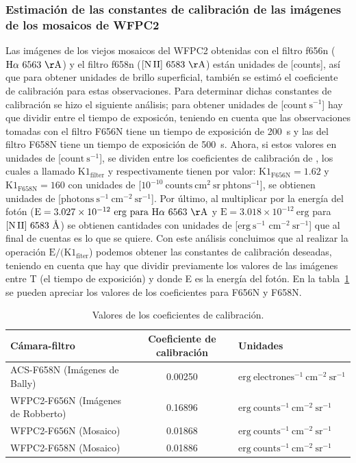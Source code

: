\subsubsection{Estimación de las  constantes de calibración de las imágenes de los mosaicos de WFPC2}
\label{sec:wpfc2}
Las imágenes de los viejos mosaicos del WFPC2  obtenidas con el filtro f656n (\(\mathrm{\ha~6563~\AA{}}\)) y el filtro f658n (\(\mathrm{\nii~6583~\AA{}}\)) están unidades de [counts], así que para obtener unidades de brillo superficial, también se estimó el coeficiente de calibración para estas observaciones. Para determinar dichas constantes de calibración se hizo el siguiente análisis; para obtener unidades de [\(\mathrm{count~s^{-1}}\)] hay que  dividir entre el tiempo de exposicón, teniendo en cuenta que las observaciones tomadas con el filtro F656N tiene un tiempo de exposición de 200~s y las del filtro F658N tiene un tiempo de exposición de 500~s. Ahora, si estos valores en unidades de [\(\mathrm{count~s^{-1}}\)], se dividen entre los coeficientes de calibración de \citet{Odell:2009}, los cuales a llamado \(\mathrm{K1_{filter}}\) y respectivamente tienen por valor: \(\mathrm{K1_{F656N} = 1.62}\) y \(\mathrm{K1_{F658N} = 160}\) con unidades de [\(\mathrm{10^{-10}~counts~cm^{2}~sr~phtons^{-1}}\)], se obtienen unidades de [\(\mathrm{photons~s^{-1}~cm^{-2}~sr^{-1}}\)]. Por último, al multiplicar por la energía del fotón (\(\mathrm{E=3.027\times 10^{-12}~erg~para~\ha{}~6563~\AA{}}\) y \(\mathrm{E=3.018 \times10^{-12}~erg}\) para \(\mathrm{[N\,II]}{}~6583~\text{\AA{}}{}\)) se obtienen cantidades con unidades de [\(\mathrm{erg~s^{-1}}\)  \(\mathrm{cm^{-2}~sr^{-1}}\)] que al final de cuentas es lo que se quiere.  Con este análisis concluimos que al realizar la operación \(\text{E}/(\mathrm{K1_{fiter}}\))  podemos obtener las constantes de calibración deseadas, teniendo en cuenta que hay que dividir previamente los valores de las imágenes entre T (el tiempo de exposición) y donde E es la energía del fotón. En la tabla~\ref{tab:table-constans} se pueden apreciar los valores de los coeficientes para F656N y F658N.


\begin{table}[!hb]
\centering
\small\raggedright
\renewcommand{\arraystretch}{1.7}
\caption{Valores de los coeficientes de calibración.}
  \label{tab:table-constans}
\setlength\tabcolsep{2.3pt}
\begin{tabular}{ |l| |c| |l| }
\hline
Cámara-filtro&                       Coeficiente de calibración&       Unidades\\ \hline 
ACS-F658N (Imágenes de Bally)&       0.00250 &                          \(\mathrm{erg~electrones^{-1}~cm^{-2}~sr^{-1}}\)\\
WFPC2-F656N (Imágenes de Robberto)&  0.16896 &                          \(\mathrm{erg~counts^{-1}~cm^{-2}~sr^{-1}}\)\\
WFPC2-F656N (Mosaico)&               0.01868 &                          \(\mathrm{erg~counts^{-1}~cm^{-2}~sr^{-1}}\)\\
WFPC2-F658N (Mosaico)&               0.01886 &                          \(\mathrm{erg~counts^{-1}~cm^{-2}~sr^{-1}}\)\\ 
\hline
 \end{tabular}
 \end{table}
\normalsize

